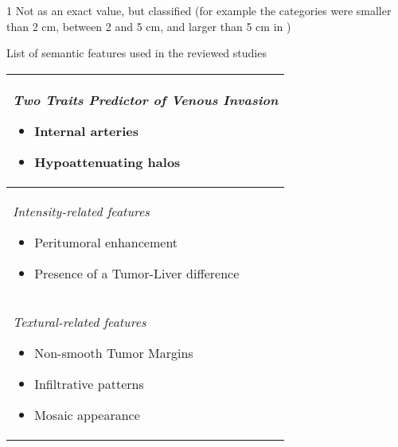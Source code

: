 \begin{minipage}{17cm}
\begin{threeparttable}
\begin{tablenotes}
\item[1] {Not as an exact value, but classified (for example
the categories were smaller than 2 cm, between 2 and 5 cm, and larger than 5 cm in \cite{Renzulli2016})} 
\end{tablenotes}
\end{threeparttable}
\hspace{0.5cm}
\begin{threeparttable}
\caption{List of semantic features used in the reviewed studies}
\label{tab:SemanticFeatures}
\begin{tabularx}{7.5cm}{|X|}
\hline
\emph{Two Traits Predictor of Venous Invasion}
\begin{itemize}
\item Internal arteries \cite{Renzulli2016,Kuo2007,Peng2018,Segal2007,Banerjee2015,Taouli2017}
\item Hypoattenuating halos \cite{Renzulli2016,Peng2018,Segal2007,Banerjee2015}
\end{itemize} \\ \hline
\emph{Intensity-related features}
\begin{itemize}
\item Peritumoral enhancement \cite{Renzulli2016}
\item Presence of a Tumor-Liver difference \cite{Banerjee2015}
\end{itemize} \\ \hline
\emph{Textural-related features}
\begin{itemize}
\item Non-smooth Tumor Margins \cite{Renzulli2016,Kuo2007,Peng2018}
\item Infiltrative patterns \cite{Taouli2017}
\item Mosaic appearance \cite{Taouli2017}
\end{itemize} \\
\hline
\end{tabularx}
\end{threeparttable}
\end{minipage}


\renewcommand{\arraystretch}{5}
\renewcommand{\baselinestretch}{1.75}